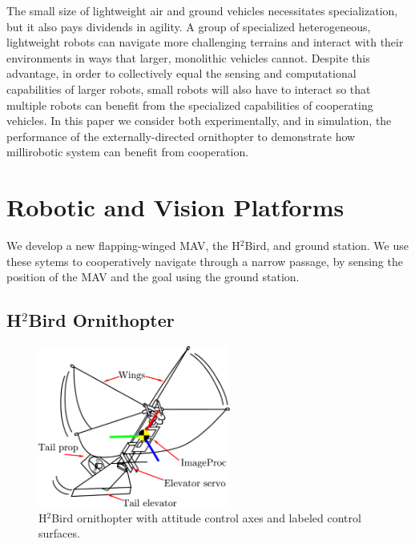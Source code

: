 \documentclass{aamas2013}
\begin{document}
The small size of lightweight air and ground vehicles necessitates 
specialization, but it also pays dividends in agility. A group of specialized 
heterogeneous, lightweight robots can navigate more challenging terrains and 
interact with their environments in ways that larger, monolithic vehicles 
cannot. Despite this advantage, in order to collectively equal the sensing and 
computational capabilities of larger robots, small robots will also have to interact 
so that multiple robots can benefit from the specialized capabilities of 
cooperating vehicles. In this paper we consider both experimentally, and in 
simulation, the performance of the externally-directed ornithopter to 
demonstrate how millirobotic system can benefit from cooperation.

\section{Robotic and Vision Platforms}

We develop a new flapping-winged MAV, the H$^2$Bird, and ground station. We
use these sytems to cooperatively navigate through a narrow passage, by
sensing the position of the MAV and the goal using the ground station.

\subsection{H$^2$Bird Ornithopter}

\begin{figure}[!tb]
\centering
\includegraphics[height=150pt]{figures/h2bird_axes.pdf}
\caption{H$^2$Bird ornithopter with attitude control axes and labeled 
control surfaces.}
\label{fig:h2Bird_axes}
\end{figure}
\end{document}
